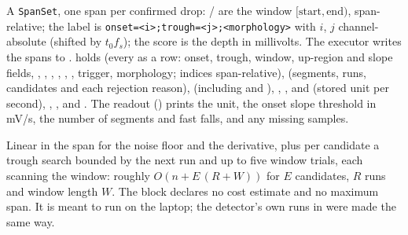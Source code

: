 A \texttt{SpanSet}, one span per confirmed drop: / are the window
$[\text{start}, \text{end})$, span-relative; the label is
\texttt{onset=<i>;trough=<j>;<morphology>} with $i$, $j$ channel-absolute (shifted by
$t_0 f_s$); the score is the depth in millivolts. The executor writes the spans to
.  holds  (every  as a row:
onset, trough, window, up-region and slope fields, ,
, , ,
, , trigger, morphology; indices span-relative),
 (segments, runs, candidates and each rejection reason), 
(including  and ),
, ,  and
 (stored unit per second), , ,
 and . The readout () prints the unit, the onset
slope threshold in mV/s, the number of segments and fast falls, and any missing samples.

Linear in the span for the noise floor and the derivative, plus per candidate a trough search
bounded by the next run and up to five window trials, each scanning the window: roughly
$O(n + E\,(R + W))$ for $E$ candidates, $R$ runs and window length $W$. The block declares no
cost estimate and no maximum span. It is meant to run on the laptop; the detector's own runs
in  were made the same way.

